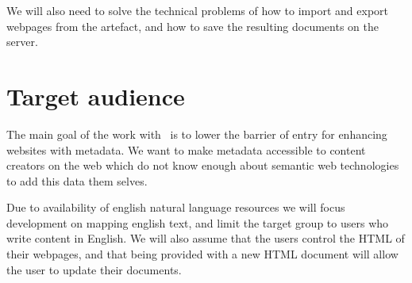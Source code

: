We will also need to solve the technical problems of how to import and export webpages from the artefact,
and how to save the resulting documents on the server.


%
%
%
%

\section{Target audience}
The main goal of the work with \theartefact\ is to lower the barrier of entry for enhancing websites with metadata.
We want to make metadata accessible to content creators on the web which do not know enough about semantic web technologies
to add this data them selves.

Due to availability of english natural language resources we will focus development on mapping english text,
and  limit the target group to users who write content in English.
We will also assume that the users control the HTML of their webpages,
and that being provided with a new HTML document will allow the user to update their documents.

